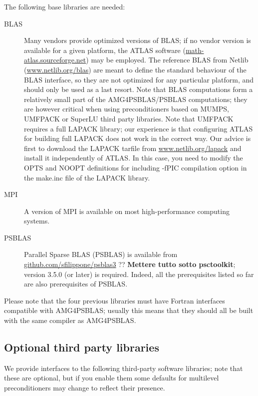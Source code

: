 The following base libraries are needed:
\begin{description}
\item[BLAS] \cite{blas3,blas2,blas1} Many vendors provide optimized versions
  of BLAS; if no vendor version is
  available for a given platform, the ATLAS software
  (\url{math-atlas.sourceforge.net})
  may be employed.  The reference BLAS from Netlib
  (\url{www.netlib.org/blas}) are meant to define the standard
  behaviour of the BLAS interface, so they are not optimized for any
  particular platform, and should only be used as a last
  resort. Note that BLAS computations form a relatively small part of
  the AMG4PSBLAS/PSBLAS computations; they are however critical when using
  preconditioners based on MUMPS, UMFPACK or SuperLU third party
  libraries. Note that UMFPACK requires a full LAPACK library; our
experience is that configuring ATLAS for building full LAPACK does not
work in the correct way. Our advice is first to download the LAPACK tarfile from
\url{www.netlib.org/lapack} and install it independently of ATLAS. In this case,
you need to modify the OPTS and NOOPT definitions for including -fPIC compilation option
in the make.inc file of the LAPACK library.
\item[MPI] \cite{MPI2,MPI1} A version of MPI is available on most
  high-performance computing systems.
 \item[PSBLAS] \cite{PSBLASGUIDE,psblas_00} Parallel Sparse BLAS (PSBLAS) is
  available from \url{github.com/sfilippone/psblas3} ?? {\bf Mettere tutto sotto psctoolkit}; version
  3.5.0  (or later) is required. Indeed, all the prerequisites
  listed so far are also prerequisites of PSBLAS.
\end{description}
Please note that the four previous libraries must have Fortran
interfaces compatible with AMG4PSBLAS;
usually this means that they should all be built with the same
compiler as AMG4PSBLAS.

\subsection{Optional third party libraries\label{sec:third-party}}

We provide interfaces to the following third-party software libraries;
note that these are optional, but if you enable them some defaults
for multilevel preconditioners may change to reflect their presence.

